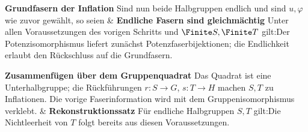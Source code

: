 \begin{BandUebersicht}
\textbf{Grundfasern der Inflation}
Sind nun beide Halbgruppen endlich und sind \(u,\varphi\) wie
zuvor gewählt, so seien
&
\textbf{Endliche Fasern sind gleichmächtig}
Unter allen Voraussetzungen des vorigen Schritts und
\(\Finite S,\Finite T\) gilt:Der Potenzisomorphismus liefert zunächst Potenzfaserbijektionen;
die Endlichkeit erlaubt den Rückschluss auf die Grundfasern.
 \\
\addlinespace[.8ex]

\textbf{Zusammenfügen über dem Gruppenquadrat}
Das Quadrat ist eine Unterhalbgruppe; die Rückführungen
\(r:S\to G\), \(s:T\to H\) machen \(S,T\) zu Inflationen.
Die vorige Faserinformation wird mit dem Gruppenisomorphismus verklebt.
&
\textbf{Rekonstruktionssatz}
Für endliche Halbgruppen \(S,T\) gilt:Die Nichtleerheit von \(T\) folgt bereits aus diesen Voraussetzungen.
 \\
\addlinespace[.8ex]
\end{BandUebersicht}

